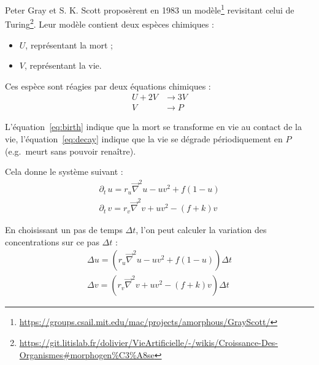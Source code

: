 \documentclass[11pt]{scrartcl}
\begin{document}
        Peter Gray et S. K. Scott proposèrent en 1983 un
        modèle\footnote{\url{https://groups.csail.mit.edu/mac/projects/amorphous/GrayScott/}} revisitant celui de
        Turing\footnote{\url{https://git.litislab.fr/dolivier/VieArtificielle/-/wikis/Croissance-Des-Organismes\#morphogen\%C3\%A8se}}.
        Leur modèle contient deux espèces chimiques :

        \begin{itemize}
            \item $U$, représentant la mort ;
            \item $V$, représentant la vie.
        \end{itemize}

        Ces espèce sont réagies par deux équations chimiques :
        \begin{align}
            U + 2V &\longrightarrow 3V \label{eq:birth} \\
            V &\longrightarrow P \label{eq:decay}
        \end{align}

        L'équation~\ref{eq:birth} indique que la mort se transforme en vie au contact de la vie,
        l'équation~\ref{eq:decay} indique que la vie se dégrade périodiquement en $P$ (e.g.\ meurt sans pouvoir
        renaître).

        Cela donne le système suivant :
        \begin{gather*}
            \partial_t \, u = r_u \overrightarrow{\nabla}^2 u - uv^2 + f(1 - u) \\
            \partial_t \, v = r_v \overrightarrow{\nabla}^2 v + uv^2 - (f + k)v
        \end{gather*}

        En choisissant un pas de temps $\Delta t$, l'on peut calculer la variation des concentrations sur ce pas $\Delta t$ :
        \begin{gather*}
            \Delta u = \left(r_u \overrightarrow{\nabla}^2 u - uv^2 + f(1 - u)\right)\Delta t \\
            \Delta v = \left(r_v \overrightarrow{\nabla}^2 v + uv^2 - (f + k)v\right)\Delta t
        \end{gather*}
\end{document}
